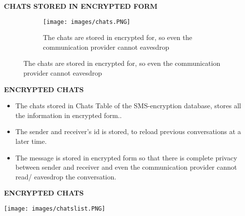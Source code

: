 \documentclass{beamer}
\begin{document}
\begin{frame}[plain]
\begin{tcolorbox}
\begin{center}
\textsc{\textbf{\textcolor{byzantium}{CHATS STORED IN ENCRYPTED FORM}}}
\end{center}
\end{tcolorbox}
\begin{figure}
\centering
\begin{subfigure}{\textwidth}
  \centering
  \texttt{[image: images/chats.PNG]}
  \caption{The chats are stored in encrypted for, so even the communication provider cannot eavesdrop}
  \label{fig:sub1}
\end{subfigure}
\end{figure}
\end{frame}

\begin{frame}
\begin{tcolorbox}
\begin{center}
\textsc{\textbf{\textcolor{byzantium}{ENCRYPTED CHATS}}}
\end{center}
\end{tcolorbox}
\begin{flushleft}
\begin{itemize}
\item The chats stored in Chats Table of the SMS-encryption database, stores all the information in encrypted form..
\item The sender and receiver’s id is stored, to reload previous conversations at a later time.
\item The message is stored in encrypted form so that there is complete privacy between sender and receiver and even the communication provider cannot read/ eavesdrop the conversation.
\end{itemize}
\end{flushleft}
\end{frame}

\begin{frame}
\begin{tcolorbox}
\begin{center}
\textsc{\textbf{\textcolor{byzantium}{ENCRYPTED CHATS}}}
\end{center}
\end{tcolorbox}
\begin{center}
\texttt{[image: images/chatslist.PNG]}
\end{center}
\end{frame}
\end{document}
